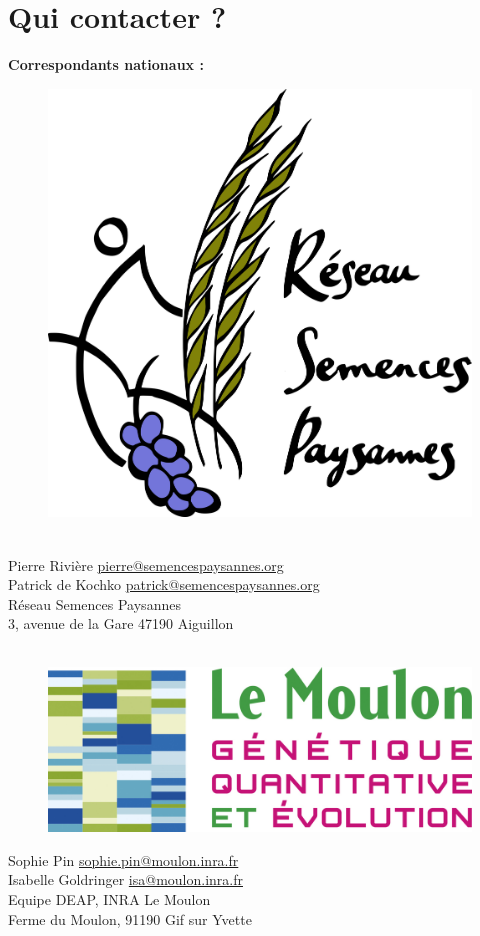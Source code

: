 \chapter*{Qui contacter ?}

\vfill

\noindent\textbf{\textsf{Correspondants nationaux :}} \\

\begin{figure}
\begin{center} \vspace{-20pt}
\includegraphics[width=.20\textwidth]{tex_files/Logo-RSP}
\end{center} \vspace{-20pt}
\end{figure}
\noindent
~\\
Pierre Rivière \href{mailto:pierre@semencespaysannes.org}{pierre@semencespaysannes.org} \\
Patrick de Kochko \href{mailto:patrick@semencespaysannes.org}{patrick@semencespaysannes.org} \\
Réseau Semences Paysannes \\
3, avenue de la Gare 47190 Aiguillon \\
~\\

\vfill

\begin{figure}
\begin{center} \vspace{-20pt}
\includegraphics[width=.20\textwidth]{tex_files/Logo-UMRGV}
\end{center} \vspace{-20pt}
\end{figure}
\noindent
Sophie Pin \href{mailto:sophie.pin@moulon.inra.fr}{sophie.pin@moulon.inra.fr} \\
Isabelle Goldringer \href{mailto:isa@moulon.inra.fr}{isa@moulon.inra.fr} \\
Equipe DEAP, INRA Le Moulon  \\
Ferme du Moulon, 91190 Gif sur Yvette \\

